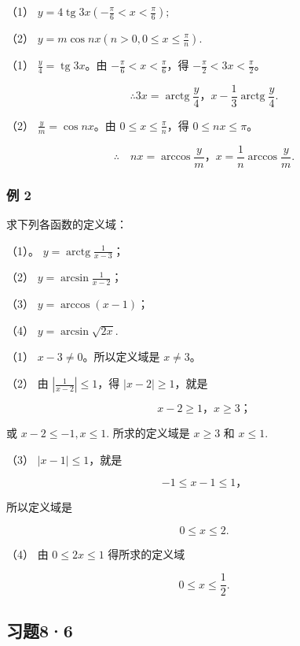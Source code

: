 （1）
\(y = 4 \operatorname{tg} 3x \left( -\frac{\pi}{6} < x < \frac{\pi}{6} \right);\)

（2）
\(y = m \cos nx \left( n > 0, 0 \leqslant x \leqslant \frac{\pi}{n} \right).\)

 （1） \(\frac{y}{4} = \operatorname{tg} 3x\)。由
\(-\frac{\pi}{6} < x < \frac{\pi}{6}\)，得
\(-\frac{\pi}{2} < 3x < \frac{\pi}{2}\)。

\[
\therefore 3 x = \operatorname{arctg} \frac {y}{4}\text{，} x - \frac {1}{3} \operatorname{arctg} \frac {y}{4}.
\]

（2） \(\frac{y}{m} = \cos nx\)。由
\(0 \leqslant x \leqslant \frac{\pi}{n}\)，得
\(0 \leqslant nx \leqslant \pi\)。

\[
\therefore \quad n x = \arccos \frac {y}{m}\text{，} x = \frac {1}{n} \arccos \frac {y}{m}.
\]

\subsubsection{例 2}

求下列各函数的定义域：

（1）。 \(y = \operatorname{arctg} \frac{1}{x - 3}\)；

（2） \(y = \arcsin \frac{1}{x - 2}\)；

（3） \(y = \arccos(x - 1)\)；

（4） \(y = \arcsin \sqrt{2x}\).

 （1） \(x - 3 \neq 0\)。所以定义域是 \(x \neq 3\)。

（2） 由 \(\left|\frac{1}{x-2}\right| \leqslant 1\)，得
\(|x-2| \geqslant 1\)，就是

\[
x - 2 \geqslant 1\text{，} x \geqslant 3\text{；}
\]

或 \(x - 2 \leqslant -1, x \leqslant 1.\) 所求的定义域是
\(x \geqslant 3\) 和 \(x \leqslant 1\).

（3） \(|x - 1| \leqslant 1\)，就是

\[
- 1 \leqslant x - 1 \leqslant 1\text{，}
\]

所以定义域是

\[
0 \leqslant x \leqslant 2.
\]

（4） 由 \(0 \leqslant 2x \leqslant 1\) 得所求的定义域

\[
0 \leqslant x \leqslant \frac {1}{2}.
\]

\subsection{习题8·6}

